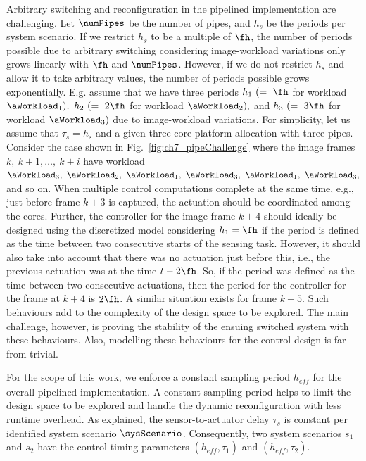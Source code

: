 Arbitrary switching and reconfiguration in the pipelined implementation are challenging.
Let $\numPipes$ be the number of pipes, and $h_s$ be the periods per system scenario. 
If we restrict $h_s$ to be a multiple of $\fh$, the number of periods possible due to arbitrary switching considering image-workload variations only grows linearly with $\fh$ and $\numPipes$.
However, if we do not restrict $h_s$ and allow it to take arbitrary values, the number of periods possible grows exponentially.
E.g. assume that we have three periods $h_1\ (=\ \fh$ for workload $\aWorkload_1),\ h_2\ (=\ 2\fh$ for workload $\aWorkload_2),$ and $h_3\ (=\ 3\fh$ for workload $\aWorkload_3)$ due to image-workload variations.
For simplicity, let us assume that $\tau_s=h_s$ and a given three-core platform allocation with three pipes. Consider the case shown in Fig.~\ref{fig:ch7_pipeChallenge} where the image frames $k,\ k+1, \dots,\ k+i$ have workload $\aWorkload_3,\ \aWorkload_2,\ \aWorkload_1,\ \aWorkload_3,\ \aWorkload_1,\ \aWorkload_3,$ and so on. When multiple control computations complete at the same time, e.g., just before frame $k+3$ is captured, the actuation should be coordinated among the cores.
Further, the controller for the image frame $k+4$ should ideally be designed using the discretized model considering $h_1=\fh$ if the period is defined as the time between two consecutive starts of the sensing task. However, it should also take into account that there was no actuation just before this, i.e., the previous actuation was at the time $t-2\fh$. So, if the period was defined as the time between two consecutive actuations, then the period for the controller for the frame at $k+4$ is $2\fh$.
A similar situation exists for frame $k+5$.
Such behaviours add to the complexity of the design space to be explored.
The main challenge, however, is proving the stability of the ensuing switched system with these behaviours.
Also, modelling these behaviours for the control design is far from trivial. 

For the scope of this work, we enforce a constant sampling period $h_\mathit{eff}$ for the overall pipelined implementation.
A constant sampling period helps to limit the design space to be explored and handle the dynamic reconfiguration with less runtime overhead.
As explained, the sensor-to-actuator delay $\tau_s$ is  constant per identified system scenario $\sysScenario$. Consequently, two system scenarios $s_1$ and $s_2$ have the control timing parameters $(h_\mathit{eff},\tau_1)$ and $(h_\mathit{eff},\tau_2)$.

